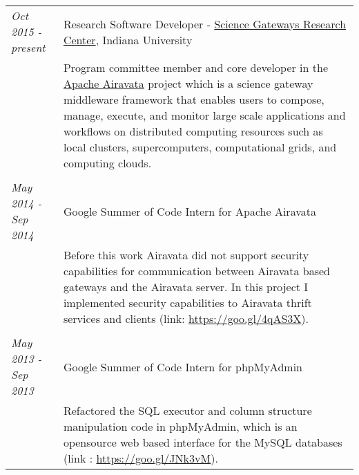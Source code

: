 \documentclass[a4paper,10pt]{article}
\begin{document}
\begin{tabular}{p{3cm}p{13.5cm}}

\emph{Oct 2015 - present}& Research Software Developer - \href{https://sgrc.iu.edu}{Science Gateways Research Center}, Indiana University\\
&\footnotesize{Program committee member and core developer in the \href{https://goo.gl/s9Gm3k}{Apache Airavata} project which is a science gateway middleware framework that enables users to compose, manage, execute, and monitor large scale applications and workflows on distributed computing resources such as local clusters, supercomputers, computational grids, and computing clouds.}\\\\

\emph{May 2014 - Sep 2014}& Google Summer of Code Intern for Apache Airavata\\
&\footnotesize{Before this work Airavata did not support security capabilities for communication between Airavata based gateways and the Airavata server. In this project I implemented security capabilities to Airavata thrift services and clients (link: \url{https://goo.gl/4qAS3X}).}\\\\


\emph{May 2013 - Sep 2013} & Google Summer of Code Intern for phpMyAdmin 
\\&\footnotesize{Refactored the SQL executor and column structure manipulation code in phpMyAdmin, which is an opensource web based interface for the MySQL databases (link : \url{https://goo.gl/JNk3vM}).}
\end{tabular}


\end{document}
